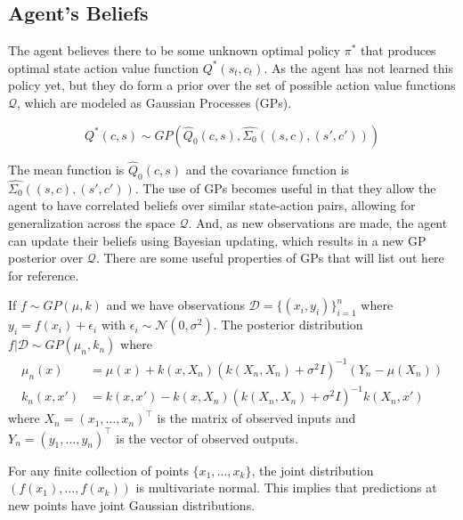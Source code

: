 \subsection{Agent's Beliefs}

The agent believes there to be some unknown optimal policy $\pi^*$ that produces
optimal state action value function $Q^*(s_t, c_t)$. As the agent has not learned this policy
yet, but they do form a prior over the set of possible action value functions $\mathcal{Q}$, which
are modeled as Gaussian Processes (GPs).

\begin{equation}
    Q^*(c,s) \sim GP\left(\hat{Q}_0(c,s), \hat{\Sigma_0}((s,c), (s', c'))\right)
\end{equation}

The mean function is $\hat{Q}_0(c,s)$ and the covariance function is $\hat{\Sigma_0}((s,c), (s', c'))$.
The use of GPs becomes useful in that they allow the agent to have correlated beliefs over
similar state-action pairs, allowing for generalization across the space $\mathcal{Q}$. And,
as new observations are made, the agent can update their beliefs using Bayesian updating, 
which results in a new GP posterior over $\mathcal{Q}$. There are some useful properties 
of GPs that will list out here for reference.

\begin{proposition}
    If $f \sim GP(\mu, k)$ and we have observations $\mathcal{D} = \{(x_i, y_i)\}_{i=1}^n$ where $y_i = f(x_i) + \epsilon_i$ with $\epsilon_i \sim \mathcal{N}(0, \sigma^2)$.
    The posterior distribution $f | \mathcal{D} \sim GP(\mu_n, k_n)$ where
\begin{align*}
\mu_n(x) &= \mu(x) + k(x, X_n)(k(X_n, X_n) + \sigma^2 I)^{-1}(Y_n - \mu(X_n)) \\
        k_n(x, x') &= k(x, x') - k(x, X_n)(k(X_n, X_n) + \sigma^2 I)^{-1}k(X_n, x')
\end{align*}
    where $X_n = (x_1, \ldots, x_n)^\top$ is the matrix of observed inputs and $Y_n = (y_1, \ldots, y_n)^\top$ is the vector of observed outputs.
\end{proposition}

\begin{proposition}
    For any finite collection of points $\{x_1, \ldots, x_k\}$, the joint distribution $(f(x_1), \ldots, f(x_k))$ is multivariate normal. This implies that predictions at new points have joint Gaussian distributions.
\end{proposition}

